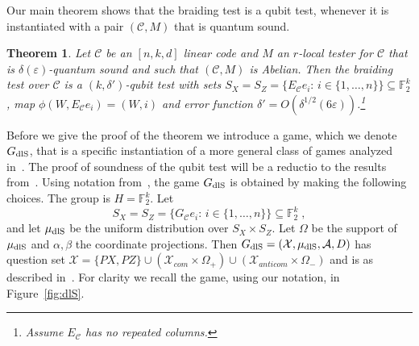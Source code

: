 \documentclass[11pt]{article}
\newtheorem{theorem}{Theorem}[section]
\theoremstyle{definition}
\newcommand{\code}{\mathcal{C}}
\newcommand{\field}{\mathbb{F}_2}
\newcommand{\dlS}{\ensuremath{\rm dlS}}
\newcommand{\mA}{\ensuremath{\mathcal{A}}}
\newcommand{\mX}{\ensuremath{\mathcal{X}}}
\newcommand{\eps}{\varepsilon}
\begin{document}
Our main theorem shows that the braiding test is a qubit test, whenever it is instantiated with a pair $(\code,M)$ that is quantum sound. 

\begin{theorem}\label{thm:main}
Let $\code$ be an $[n,k,d]$ linear code and $M$ an $r$-local tester for $\code$ that is $\delta(\eps)$-quantum sound and such that $(\code,M)$ is Abelian. Then the braiding test over $\code$ is a $(k,\delta')$-qubit test with sets $S_X=S_Z=\{E_\code e_i:\,i\in\{1,\ldots,n\}\}\subseteq \field^k$, map $\phi(W,E_\code e_i)=(W,i)$ and error function $\delta' = O(\delta^{1/2}(6\eps))$.\footnote{Assume $E_\code$ has no repeated columns.} 
\end{theorem}

Before we give the proof of the theorem we introduce a game, which we denote $G_{\dlS}$, that is a specific instantiation of a more general class of games analyzed in~\cite[Section 3.4]{de2022spectral}. The proof of soundness of the qubit test will be a reductio to the results from~\cite{de2022spectral}. Using notation from~\cite{de2022spectral}, the game $G_{\dlS}$ is obtained by making the following choices. The group is $H=\field^k$. Let
\[ S_X=S_Z=\{G_\code e_i:\,i\in\{1,\ldots,n\}\}\subseteq \field^k\;,\]
and let $\mu_{\dlS}$ be the uniform distribution over $S_X\times S_Z$. Let $\Omega$ be the support of $\mu_{\dlS}$ and $\alpha,\beta$ the coordinate projections. Then $G_{\dlS}=(\mX,\mu_{\dlS},\mA,D)$ has question set $\mX = \{PX,PZ\} \cup (\mX_{com}\times \Omega_+) \cup (\mX_{anticom} \times \Omega_-)$ and is as described in~\cite[Section 3.4]{de2022spectral}. For clarity we recall the game, using our notation, in Figure~\ref{fig:dlS}. 
\end{document}
